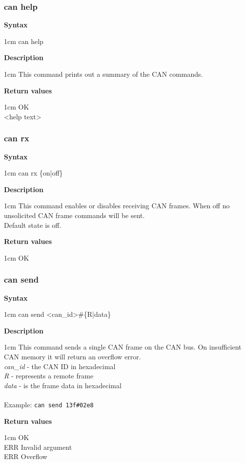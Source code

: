 \documentclass{article}[a4paper]
\begin{document}
\subsubsection{can help}
\begin{tcolorbox}
	{\bf Syntax}

	 1cm \dimexpr\linewidth-2cm\relax
	can help

	\medskip
	{\bf Description}

	 1cm \dimexpr\linewidth-2cm\relax
	This command prints out a summary of the CAN commands.

	\medskip
	{\bf Return values}

	 1cm \dimexpr\linewidth-2cm\relax
	OK \\
	<help text>
\end{tcolorbox}

\subsubsection{can rx}
\begin{tcolorbox}
	{\bf Syntax}

	 1cm \dimexpr\linewidth-2cm\relax
	can rx \{on|off\}

	\medskip
	{\bf Description}

	 1cm \dimexpr\linewidth-2cm\relax
	This command enables or disables receiving CAN frames. When off no unsolicited
	CAN frame commands will be sent. \\
	Default state is off.

	\medskip
	{\bf Return values}

	 1cm \dimexpr\linewidth-2cm\relax
	OK
\end{tcolorbox}

\subsubsection{can send}
\begin{tcolorbox}
	{\bf Syntax}

	 1cm \dimexpr\linewidth-2cm\relax
	can send <can\_id>\#\{R|data\}

	\medskip
	{\bf Description}

	 1cm \dimexpr\linewidth-2cm\relax
	This command sends a single CAN frame on the CAN bus. On insufficient CAN
	memory it will return an overflow error.
	\medskip \\
	{\it can\_id} - the CAN ID in hexadecimal \\
	{\it R} - represents a remote frame \\
	{\it data} - is the frame data in hexadecimal \\
	\medskip \\
	Example: \texttt{can send 13f\#02e8}

	\medskip
	{\bf Return values}

	 1cm \dimexpr\linewidth-2cm\relax
	OK \\
	ERR Invalid argument \\
	ERR Overflow
\end{tcolorbox}
\end{document}
